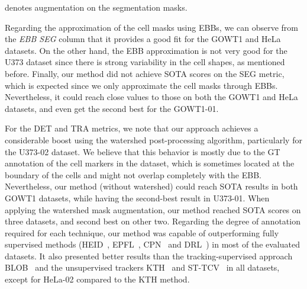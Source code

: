 \documentclass{article}
\begin{document}
\begin{table}[]
\begin{minipage}{\textwidth}
\vspace{0.1cm}
\small * denotes augmentation on the segmentation masks.
\end{minipage}
\label{tab:ISBI_results}
\end{table}

Regarding the approximation of the cell masks using EBBs, we can observe from the \emph{EBB SEG} column that it provides a good fit for the GOWT1 and HeLa datasets. On the other hand, the EBB approximation is not very good for the U373 dataset since there is strong variability in the cell shapes, as mentioned before. Finally, our method did not achieve SOTA scores on the SEG metric, which is expected since we only approximate the cell masks through EBBs. Nevertheless, it could reach close values to those on both the GOWT1 and HeLa datasets, and even get the second best for the GOWT1-01.

For the DET and TRA metrics, we note that our approach achieves a considerable boost using the watershed post-processing algorithm, particularly for the U373-02 dataset. We believe that this behavior is mostly due to the GT annotation of the cell markers in the dataset, which is sometimes located at the boundary of the cells and might not overlap completely with the EBB. Nevertheless, our method (without watershed) could reach SOTA results in both GOWT1 datasets, while having the second-best result in U373-01. When applying the watershed mask augmentation, our method reached SOTA scores on three datasets, and second best on other two. Regarding the degree of annotation required for each technique, our method was capable of outperforming fully supervised methods (HEID~\cite{epflheid}, EPFL~\cite{epflheid}, CPN~\cite{cpn} and DRL~\cite{drl}) in most of the evaluated datasets. It also presented better results than the tracking-supervised approach BLOB~\cite{blob} and the unsupervised trackers KTH~\cite{kth} and ST-TCV~\cite{boukari2018automated} in all datasets, except for HeLa-02 compared to the KTH method.
\end{document}
